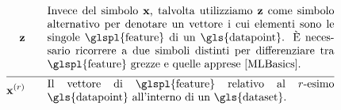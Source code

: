\begin{align}
	\rawfeaturevec \quad\quad &\parbox{.75\textwidth}{Invece del simbolo $\featurevec$, talvolta utilizziamo $\rawfeaturevec$ come simbolo alternativo per denotare un vettore i cui elementi sono le singole \glspl{feature} di un \gls{datapoint}. È necessario ricorrere a due simboli distinti per differenziare tra \glspl{feature} grezze e quelle apprese \cite[Ch. 9]{MLBasics}.}\nonumber \\[2mm] \hline \nonumber\\[-5mm]
	\featurevec^{(\sampleidx)} \quad\quad &\parbox{.75\textwidth}{Il vettore di \glspl{feature} relativo al $\sampleidx$-esimo \gls{datapoint} all'interno di un \gls{dataset}. } \nonumber %
\end{align}        


